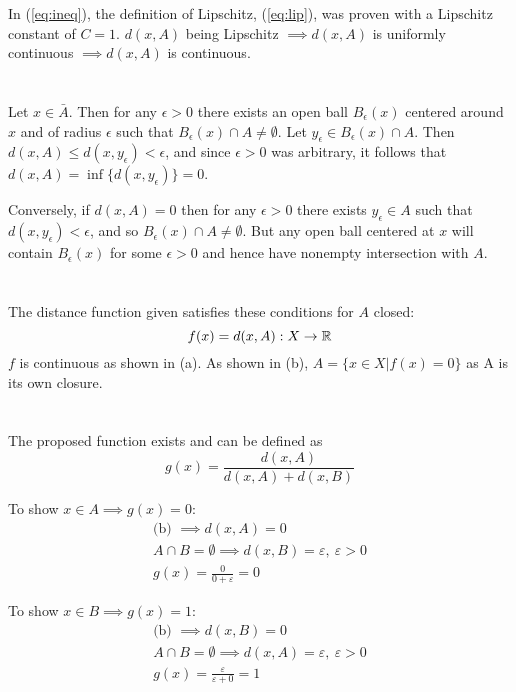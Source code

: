 \documentclass{jhwhw}
\newcommand{\R}{{\mathbb R}}
\begin{document}
In (\ref{eq:ineq}), the definition of Lipschitz, (\ref{eq:lip}), was proven with a Lipschitz constant of $C=1$.  $d(x,A)$ being Lipschitz $\implies d(x,A)$ is uniformly continuous $\implies d(x,A)$ is continuous.

\part{}%
Let $x \in \bar{A}$. Then for any $\epsilon>0$ there exists an open ball $B_\epsilon(x)$ centered around $x$ and of radius $\epsilon$ such that $B_\epsilon(x) \cap A \neq \emptyset$. Let $y_\epsilon \in B_\epsilon(x) \cap A$. Then $d(x,A) \leq d(x,y_\epsilon) < \epsilon$, and since $\epsilon>0$ was arbitrary, it follows that $d(x,A) = \inf \{d(x,y_{\epsilon})\} = 0$.

Conversely, if $d(x,A) = 0$ then for any $\epsilon>0$ there exists $y_\epsilon \in A$ such that $d(x,y_\epsilon) < \epsilon$, and so $B_{\epsilon}(x) \cap A \neq \emptyset$. But any open ball centered at $x$ will contain $B_{\epsilon}(x)$ for some $\epsilon>0$ and hence have nonempty intersection with $A$.


\part{}%
The distance function given satisfies these conditions for $A$ closed:
\begin{equation}
f(x) = d(x,A): X\to \R\\
\end{equation}
$f$ is continuous as shown in (a). As shown in (b), $ A = \{x\in X | f(x) = 0\}$ as A is its own closure.

\part{}%
The proposed function exists and can be defined as
\begin{equation}
g(x)= \frac{d(x,A)}{d(x,A)+d(x,B)}
\end{equation}

To show $x\in A \implies g(x) = 0$:
\begin{gather}
\text{(b) }\implies d(x,A)=0\\
A\cap B = \emptyset \implies d(x,B)=\varepsilon, \: \varepsilon>0\\
g(x) = \frac{0}{0+\varepsilon}=0
\end{gather}

To show $x\in B \implies g(x) = 1$:
\begin{gather}
\text{(b) }\implies d(x,B)=0\\
A\cap B = \emptyset \implies d(x,A)=\varepsilon, \: \varepsilon>0\\
g(x) = \frac{\varepsilon}{\varepsilon+0}=1
\end{gather}
\end{document}
